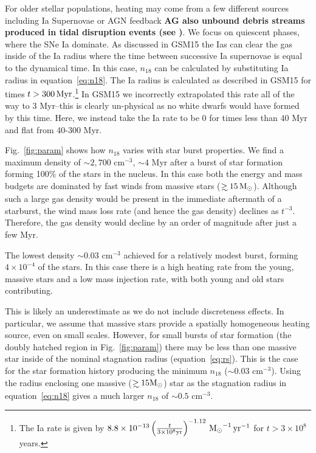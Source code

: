 \documentclass[usenatbib,fleqn]{mnras}
\newcommand\gsim{\mathrel{\rlap{\lower4pt\hbox{\hskip1pt$\sim$}}
    \raise1pt\hbox{$>$}}}
\newcommand{\Msun}{{\rm M_\odot}}
\begin{document}
For older stellar populations, heating may come from a few
different sources including Ia Supernovae or AGN feedback {\bf AG also
  unbound debris streams produced in tidal disruption events (see
  \citep{Guillochon+2015a})}. We focus on quiescent phases, where the
SNe Ia dominate. As discussed in GSM15 the Ias can clear the gas
inside of the Ia radius where the time between
successive Ia supernovae is equal to the dynamical time. In this case,
$n_{18}$ can be calculated by substituting Ia radius in
equation~\eqref{eq:n18}. The Ia radius is calculated as described in
GSM15 for times $t>300 \,{\rm Myr}$.\footnote{The Ia rate is given by $8.8
\times 10^{-13} \left(\frac{t}{3\times 10^{8} {\rm yr}}\right)^{-1.12}
\, \Msun^{-1} \, {\rm yr}^{-1} $ for $t>3\times 10^8$ years.} In GSM15
we incorrectly extrapolated this rate all of the way to 3 Myr--this is
clearly un-physical as no white dwarfs would have formed by this
time. Here, we instead take the Ia rate to be 0 for times less than 40
Myr and flat from 40-300 Myr.

Fig.~\ref{fig:param} shows how $n_{18}$ varies with star burst
properties.  We find a maximum density of $\sim 2,700$ cm$^{-3}$,
$\sim 4$ Myr after a burst of star formation forming 100\% of the
stars in the nucleus. In this case both the energy and mass budgets
are dominated by fast winds from massive stars ($\gsim 15 \, \Msun$).
Although such a large gas density would be present in the immediate
aftermath of a starburst, the wind mass loss rate (and hence the gas
density) declines as $t^{-3}$. Therefore, the gas density would
decline by an order of magnitude after just a few Myr.

The lowest density $\sim 0.03$ cm$^{-3}$ achieved for a relatively
modest burst, forming $4\times 10^{-4}$ of the stars. In this case
there is a high heating rate from the young, massive stars and a low mass
injection rate, with both young and old stars contributing.

This is likely an underestimate as we do not include discreteness
effects. In particular, we assume that massive stars provide a
spatially homogeneous heating source, even on small scales. However,
for small bursts of star formation (the doubly hatched region in
Fig.~\ref{fig:param}) there may be less than one massive star inside
of the nominal stagnation radius (equation~\ref{eq:rs}). This is the
case for the star formation history producing the minimum $n_{18}$
($\sim 0.03$ cm$^{-3}$). Using the radius enclosing one massive
($\gsim 15 \Msun$) star as the stagnation radius in
equation~\eqref{eq:n18} gives a much larger $n_{18}$ of $\sim 0.5$
cm$^{-3}$.
\end{document}
